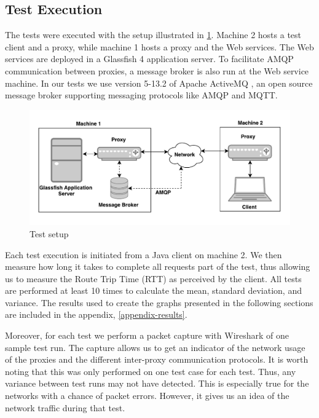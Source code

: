 \subsection{Test Execution}

The tests were executed with the setup illustrated in
\cref{figure-testing-setup}. Machine 2 hosts a test client and a proxy, while
machine 1 hosts a proxy and the Web services. The Web services are deployed in a
Glassfish 4 application server. To facilitate AMQP communication between
proxies, a message broker is also run at the Web service machine. In our tests
we use version 5-13.2 of Apache ActiveMQ \cite{activemq-homepage}, an open
source message broker supporting messaging protocols like AMQP and MQTT.

\begin{figure}[h]
\includegraphics[width=\textwidth]{images/testing_setup.png}
\caption{Test setup}
\label{figure-testing-setup}
\end{figure}

Each test execution is initiated from a Java client on machine 2. We then
measure how long it takes to complete all requests part of the test, thus
allowing us to measure the Route Trip Time (RTT) as perceived by the client. All
tests are performed at least 10 times to calculate the mean, standard deviation,
and variance. The results used to create the graphs presented in the following
sections are included in the appendix, \cref{appendix-results}.


Moreover, for each test we perform a packet capture with Wireshark of one sample
test run. The capture allows us to get an indicator of the network usage of the
proxies and the different inter-proxy communication protocols. It is worth
noting that this was only performed on one test case for each test. Thus, any
variance between test runs may not have detected. This is especially true for
the networks with a chance of packet errors. However, it gives us an idea of
the network traffic during that test.

